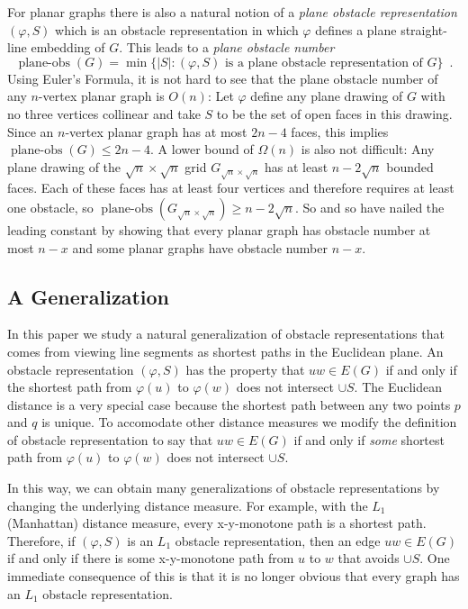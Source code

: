 \documentclass{patmorin}
\DeclareMathOperator{\planeobs}{plane-obs}
\begin{document}
For planar graphs there is also a natural notion of a \emph{plane obstacle
representation} $(\varphi, S)$ which is an obstacle representation
in which $\varphi$ defines a plane straight-line embedding of $G$.
This leads to a \emph{plane obstacle number}
\[
    \planeobs(G) = \min\{|S| :\text{$(\varphi, S)$ is a plane obstacle
        representation of $G$}\} \enspace .
\]
Using Euler's Formula, it is not hard to see that the plane obstacle
number of any $n$-vertex planar graph is $O(n)$: Let $\varphi$ define
any plane drawing of $G$ with no three vertices collinear and take $S$
to be the set of open faces in this drawing.  Since an $n$-vertex planar
graph has at most $2n-4$ faces, this implies $\planeobs(G)\le 2n-4$.
A lower bound of $\Omega(n)$ is also not difficult:  Any plane drawing
of the $\sqrt{n}\times\sqrt{n}$ grid $G_{\sqrt{n}\times\sqrt{n}}$
has at least $n-2\sqrt{n}$ bounded faces. Each of these faces has
at least four vertices and therefore requires at least one obstacle,
so $\planeobs(G_{\sqrt{n}\times\sqrt{n}})\ge n-2\sqrt{n}$.  So and so
\cite{X} have nailed the leading constant by showing that every planar
graph has obstacle number at most $n-x$ and some planar graphs have
obstacle number $n-x$.

\subsection{A Generalization}

In this paper we study a natural generalization of obstacle
representations that comes from viewing line segments as shortest paths
in the Euclidean plane.  An obstacle representation $(\varphi,S)$ has
the property that $uw\in E(G)$ if and only if the shortest path from
$\varphi(u)$ to $\varphi(w)$ does not intersect $\cup S$.  The Euclidean
distance is a very special case because the shortest path between any two
points $p$ and $q$ is unique. To accomodate other distance measures we
modify the definition of obstacle representation to say that $uw\in E(G)$
if and only if \emph{some} shortest path from $\varphi(u)$ to $\varphi(w)$
does not intersect $\cup S$.

In this way, we can obtain many generalizations of obstacle
representations by changing the underlying distance measure.  For example,
with the $L_1$ (Manhattan) distance measure, every x-y-monotone path
is a shortest path.  Therefore, if $(\varphi,S)$ is an $L_1$ obstacle
representation, then an edge $uw\in E(G)$ if and only if there is some
x-y-monotone path from $u$ to $w$ that avoids $\cup S$.  One immediate
consequence of this is that it is no longer obvious that every graph
has an $L_1$ obstacle representation.
\end{document}
